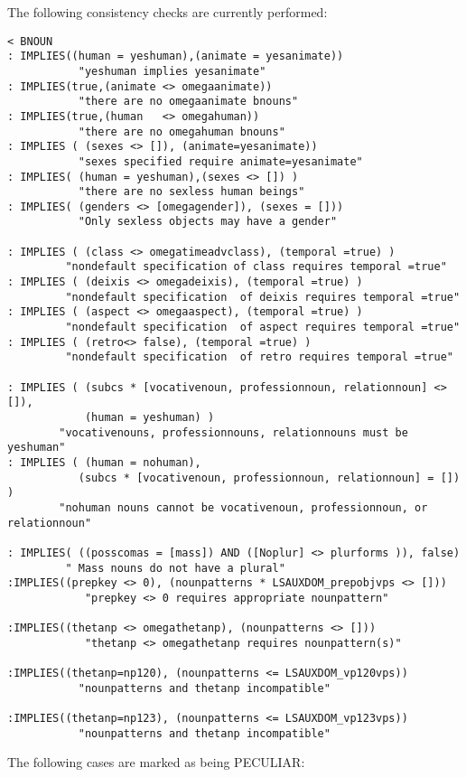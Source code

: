 The following consistency checks are currently performed:

\begin{verbatim}
< BNOUN
: IMPLIES((human = yeshuman),(animate = yesanimate)) 
           "yeshuman implies yesanimate"
: IMPLIES(true,(animate <> omegaanimate))           
           "there are no omegaanimate bnouns"
: IMPLIES(true,(human   <> omegahuman))              
           "there are no omegahuman bnouns"
: IMPLIES ( (sexes <> []), (animate=yesanimate))
           "sexes specified require animate=yesanimate"
: IMPLIES( (human = yeshuman),(sexes <> []) )
           "there are no sexless human beings"
: IMPLIES( (genders <> [omegagender]), (sexes = []))
           "Only sexless objects may have a gender"

: IMPLIES ( (class <> omegatimeadvclass), (temporal =true) )
         "nondefault specification of class requires temporal =true"
: IMPLIES ( (deixis <> omegadeixis), (temporal =true) )
         "nondefault specification  of deixis requires temporal =true"
: IMPLIES ( (aspect <> omegaaspect), (temporal =true) )
         "nondefault specification  of aspect requires temporal =true"
: IMPLIES ( (retro<> false), (temporal =true) )
         "nondefault specification  of retro requires temporal =true"

: IMPLIES ( (subcs * [vocativenoun, professionnoun, relationnoun] <> []),
            (human = yeshuman) )
        "vocativenouns, professionnouns, relationnouns must be yeshuman"
: IMPLIES ( (human = nohuman),
           (subcs * [vocativenoun, professionnoun, relationnoun] = []) )
        "nohuman nouns cannot be vocativenoun, professionnoun, or relationnoun"

: IMPLIES( ((posscomas = [mass]) AND ([Noplur] <> plurforms )), false)
         " Mass nouns do not have a plural"
:IMPLIES((prepkey <> 0), (nounpatterns * LSAUXDOM_prepobjvps <> []))
            "prepkey <> 0 requires appropriate nounpattern"

:IMPLIES((thetanp <> omegathetanp), (nounpatterns <> []))
            "thetanp <> omegathetanp requires nounpattern(s)"

:IMPLIES((thetanp=np120), (nounpatterns <= LSAUXDOM_vp120vps))
           "nounpatterns and thetanp incompatible"

:IMPLIES((thetanp=np123), (nounpatterns <= LSAUXDOM_vp123vps))
           "nounpatterns and thetanp incompatible"

\end{verbatim}
\vspace{3 ex}
The following cases are marked as being PECULIAR:

